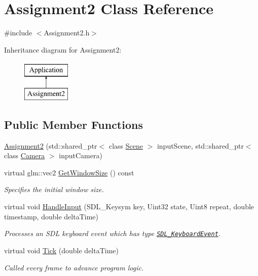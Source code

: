 \hypertarget{class_assignment2}{}\section{Assignment2 Class Reference}
\label{class_assignment2}


{\ttfamily \#include $<$Assignment2.\+h$>$}

Inheritance diagram for Assignment2\+:\begin{figure}[H]
\begin{center}
\leavevmode
\includegraphics[height=2.000000cm]{class_assignment2}
\end{center}
\end{figure}
\subsection*{Public Member Functions}
\begin{DoxyCompactItemize}
\item 
\hyperlink{class_assignment2_ac684d2ecb894a4e71f8359e3a2ebd37f}{Assignment2} (std\+::shared\+\_\+ptr$<$ class \hyperlink{class_scene}{Scene} $>$ input\+Scene, std\+::shared\+\_\+ptr$<$ class \hyperlink{class_camera}{Camera} $>$ input\+Camera)
\item 
virtual glm\+::vec2 \hyperlink{class_assignment2_ae7ae8c9e7eb64cf9661d9ddb1992f314}{Get\+Window\+Size} () const 
\begin{DoxyCompactList}\small\item\em Specifies the initial window size. \end{DoxyCompactList}\item 
virtual void \hyperlink{class_assignment2_a3ee099a8ba45db14103541981e3c4fe8}{Handle\+Input} (S\+D\+L\+\_\+\+Keysym key, Uint32 state, Uint8 repeat, double timestamp, double delta\+Time)
\begin{DoxyCompactList}\small\item\em Processes an S\+D\+L keyboard event which has type \href{https://wiki.libsdl.org/SDL_KeyboardEvent}{\tt S\+D\+L\+\_\+\+Keyboard\+Event}. \end{DoxyCompactList}\item 
virtual void \hyperlink{class_assignment2_a41544ad361dd798d5fae1ec3197fc66e}{Tick} (double delta\+Time)
\begin{DoxyCompactList}\small\item\em Called every frame to advance program logic. \end{DoxyCompactList}\end{DoxyCompactItemize}
